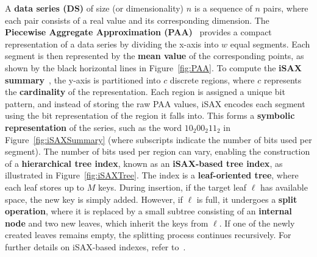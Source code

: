 \documentclass[a4paper,11pt,twoside,openany]{book}
\begin{document}
A \textbf{data series (DS)} of size (or dimensionality) \( n \) is a sequence 
of \( n \) pairs, where each pair consists of a real value and its corresponding 
dimension.
% 
The \textbf{Piecewise Aggregate Approximation (PAA)}~\cite{DBLP:journals/kais/KeoghCPM01} 
provides a compact representation of a data series by dividing the x-axis into 
\( w \) equal segments. Each segment is then represented by the \textbf{mean value} 
of the corresponding points, as shown by the black horizontal lines in 
Figure~\ref{fig:PAA}. 
% 
To compute the \textbf{iSAX summary}~\cite{shieh2008sax}, the y-axis is partitioned 
into \( c \) discrete regions, where \( c \) represents the \textbf{cardinality} 
of the representation.
%
Each region is assigned a unique bit pattern, and instead of storing the raw PAA values, 
iSAX encodes each segment using the bit representation of the region it falls into. 
This forms a \textbf{symbolic representation} of the series, 
such as the word \( 10_2 00_2 11_2 \) in Figure~\ref{fig:iSAXSummary} 
(where subscripts indicate the number of bits used per segment).
% 
The number of bits used per region can vary, enabling the construction of a 
\textbf{hierarchical tree index}, known as an \textbf{iSAX-based tree index}, as 
illustrated in Figure~\ref{fig:iSAXTree}.
The index is a \textbf{leaf-oriented tree}, where each leaf stores up to \( M \) keys.
% 
During insertion, if the target leaf \( \ell \) has available space, the new key 
is simply added. However, if \( \ell \) is full, it undergoes a \textbf{split operation},
where it is replaced by a small subtree consisting of an \textbf{internal node} and two 
new leaves, which inherit  the keys from \( \ell \). If one of the newly created leaves
remains empty, the splitting process continues recursively.
For further details on iSAX-based indexes, refer to~\cite{isaxfamily}.
\end{document}
